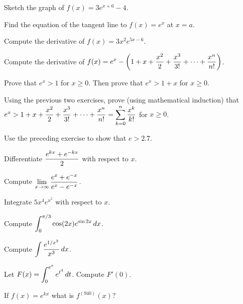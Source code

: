 \exercise Sketch the graph of $f(x) =3e^{x+6} -4 $.
\endexercise

\exercise Find the equation of the tangent line to $f(x) =e^x $
at $x= a $.
\endexercise

\exercise Compute the derivative of $f(x) = 3x^2 e^{5x-6} $.
\endexercise

\exercise Compute the derivative of 
$\displaystyle f(x)= e^x -\left( 1+ x +
{x^2\over 2} + {x^3\over3!} + \cdots + {x^n\over n!}\right)$.
\endexercise

\exercise Prove that $e^x > 1 $ for $x\geq 0$. Then prove that
$e^x > 1+ x $ for $x\geq 0 $. 
\endexercise

\exercise Using the previous two exercises, prove (using mathematical
induction) that  $\displaystyle e^x > 1+ x +
{x^2\over 2} + {x^3\over3!} + \cdots + {x^n\over n!}
=\sum_{k=0 }^n {x^k\over k!}$ for $x\geq 0 $.
\endexercise

\exercise Use the preceding exercise to show that $e> 2.7$.
\endexercise

\exercise Differentiate $\displaystyle {e^{kx}+ e^{-kx}\over 2} $ with
respect to $x$.
\endexercise

\exercise Compute $\displaystyle\lim_{x\to\infty} {e^x + e^{-x}\over e^x -e^{-x}}$. 
\endexercise

\exercise Integrate $5x^4 e^{x^5}$ with respect to
$x$.
\endexercise

\exercise Compute
$\displaystyle \int_0^{\pi/3} \cos (2x) e^{\sin 2x}\,dx$.
\endexercise

\exercise Compute $\displaystyle \int {e^{1/x^2}\over x^3}\,dx$.
\endexercise

\exercise Let $\displaystyle F(x) = \int_0^{e^x} e^{t^4}\,dt$. Compute
$F'(0)$.
\endexercise

\exercise If $f(x) =e^{kx}$ what is $f^{(940)}(x)$?
\endexercise

\endexercises
